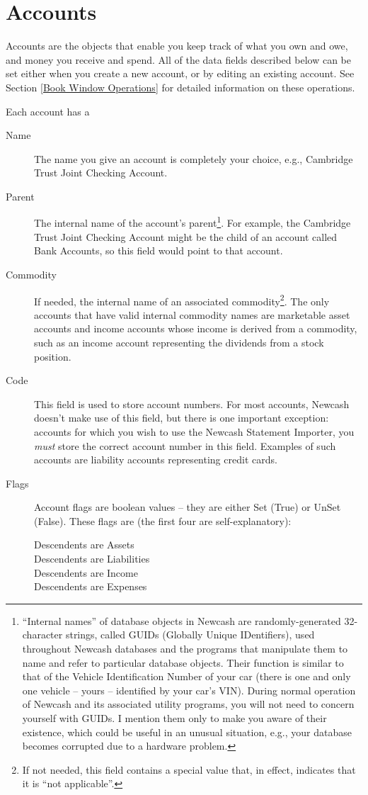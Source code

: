 \documentclass{report}
\begin{document}
\section{Accounts}
Accounts are the objects that enable you keep track of what you own and owe, and money you receive and spend. All of the data fields described below can be set either when you create a new account, or by editing an existing account. See Section \ref{Book Window Operations} for detailed information on these operations.

Each account has a
\begin{description}
\item [Name] The name you give an account is completely your choice, e.g., Cambridge Trust Joint Checking Account.
\item [Parent] The internal name of the account's parent\footnote{``Internal names'' of database objects in Newcash are randomly-generated 32-character strings, called GUIDs (Globally Unique IDentifiers), used throughout Newcash databases and the programs that manipulate them to name and refer to particular database objects. Their function is similar to that of the Vehicle Identification Number of your car (there is one and only one vehicle -- yours -- identified by your car's VIN).  During normal operation of Newcash and its associated utility programs, you will not need to concern yourself with GUIDs. I mention them only to make you aware of their existence, which could be useful in an unusual situation, e.g., your database becomes corrupted due to a hardware problem.}. For example, the Cambridge Trust Joint Checking Account might be the child of an account called Bank Accounts, so this field would point to that account.
\item [Commodity] If needed, the internal name of an associated commodity\footnote{If not needed, this field contains a special value that, in effect, indicates that it is ``not applicable''.}. The only accounts that have valid internal commodity names are marketable asset accounts and income accounts whose income is derived from a commodity, such as an income account representing the dividends from a stock position.
\item [Code] This field is used to store account numbers. For most accounts, Newcash doesn't make use of this field, but there is one important exception: accounts for which you wish to use the Newcash Statement Importer, you \emph{must} store the correct account number in this field. Examples of such accounts are liability accounts representing credit cards.
\item [Flags] Account flags are boolean values -- they are either Set (True) or UnSet (False). These flags are (the first four are self-explanatory):
\begin{description}
\item [Descendents are Assets]
\item [Descendents are Liabilities]
\item [Descendents are Income]
\item [Descendents are Expenses]


\end{description}
\end{description}
\end{document}
